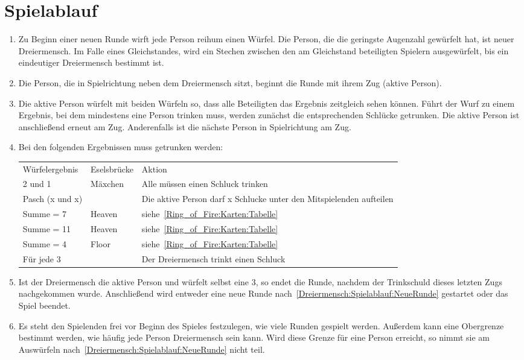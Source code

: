 \section{Spielablauf}
\begin{enumerate}[label={(\arabic*)}]
	\item\label{Dreiermensch:Spielablauf:NeueRunde}
	Zu Beginn einer neuen Runde wirft jede Person reihum einen Würfel.
	Die Person, die die geringste Augenzahl gewürfelt hat, ist neuer Dreiermensch.
	Im Falle eines Gleichstandes, wird ein Stechen zwischen den am Gleichstand beteiligten Spielern ausgewürfelt, bis ein eindeutiger Dreiermensch bestimmt ist.
	
	\item
	Die Person, die in Spielrichtung neben dem Dreiermensch sitzt, beginnt die Runde mit ihrem Zug (\glqq{}aktive Person\grqq{}).
	
	\item
	Die aktive Person würfelt mit beiden Würfeln so, dass alle Beteiligten das Ergebnis zeitgleich sehen können.
	Führt der Wurf zu einem Ergebnis, bei dem mindestens eine Person trinken muss, werden zunächst die entsprechenden Schlücke getrunken.
	Die aktive Person ist anschließend erneut am Zug.
	Anderenfalls ist die nächste Person in Spielrichtung am Zug.
	
	\item
	Bei den folgenden Ergebnissen muss getrunken werden:

	\begin{tabulary}{0.92\textwidth}{llL}
		\toprule
		Würfelergebnis   & Eselsbrücke & Aktion \\
		2 und 1          & Mäxchen & Alle müssen einen Schluck trinken \\
		Pasch (x und x)  &         & Die aktive Person darf x Schlucke unter den Mitspielenden aufteilen \\
		Summe = 7        & Heaven  & siehe~\ref{Ring_of_Fire:Karten:Tabelle} \\
		Summe = 11       & Heaven  & siehe~\ref{Ring_of_Fire:Karten:Tabelle} \\
		Summe = 4        & Floor   & siehe~\ref{Ring_of_Fire:Karten:Tabelle} \\
		Für jede 3 &         &Der Dreiermensch trinkt einen Schluck \\\bottomrule
	\end{tabulary}

	\item
	Ist der Dreiermensch die aktive Person und würfelt selbst eine 3, so endet die Runde, nachdem der Trinkschuld dieses letzten Zugs nachgekommen wurde.
	Anschließend wird entweder eine neue Runde nach~\ref{Dreiermensch:Spielablauf:NeueRunde} gestartet oder das Spiel beendet.
	
	\item
	Es steht den Spielenden frei vor Beginn des Spieles festzulegen, wie viele Runden gespielt werden.
	Außerdem kann eine Obergrenze bestimmt werden, wie häufig jede Person Dreiermensch sein kann.
	Wird diese Grenze für eine Person erreicht, so nimmt sie am Auswürfeln nach~\ref{Dreiermensch:Spielablauf:NeueRunde} nicht teil.
\end{enumerate}
